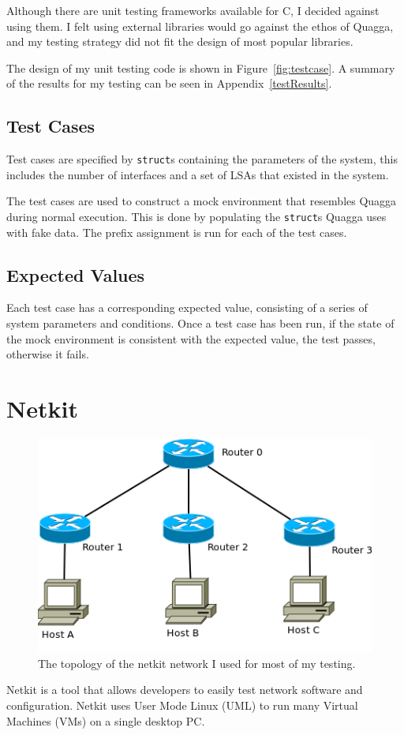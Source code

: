 \documentclass[12pt,a4paper,twoside]{report}
\begin{document}
Although there are unit testing frameworks available for C, I decided against
using them.  I felt using external libraries  would go against the ethos of
Quagga, and my testing strategy did not fit the design of most popular
libraries. 

The design of my unit testing code is shown in Figure~\ref{fig:testcase}. A
summary of the results for my testing can be seen in
Appendix~\ref{testResults}.

\subsection{Test Cases}
Test cases are specified by \texttt{struct}s containing the parameters of
the system, this includes the number of interfaces and a set of LSAs that
existed in the system. 

The test cases are used to construct a mock environment that resembles
Quagga during normal execution. This is done by populating the \texttt{struct}s
Quagga uses with fake data. The prefix assignment is run for each of the test
cases. 

\subsection{Expected Values}
Each test case has a corresponding expected value, consisting of a
series of system parameters and conditions. Once a test case has been run, if
the state of the mock environment is consistent with the expected value, the
test passes, otherwise it fails. 

\section{Netkit} 
\begin{figure}
\begin{center}
	\includegraphics[width=\linewidth]{../Diagrams/Network/MainNetkit.png}
	\caption{The topology of the netkit network I used for most of my testing.}
	\label{fig:NetkitTopology}
\end{center}
\end{figure}
Netkit is a tool that allows developers to easily test network software and
configuration. Netkit uses User Mode Linux (UML)  to run many Virtual Machines (VMs) 
on a single desktop PC. 
\end{document}
